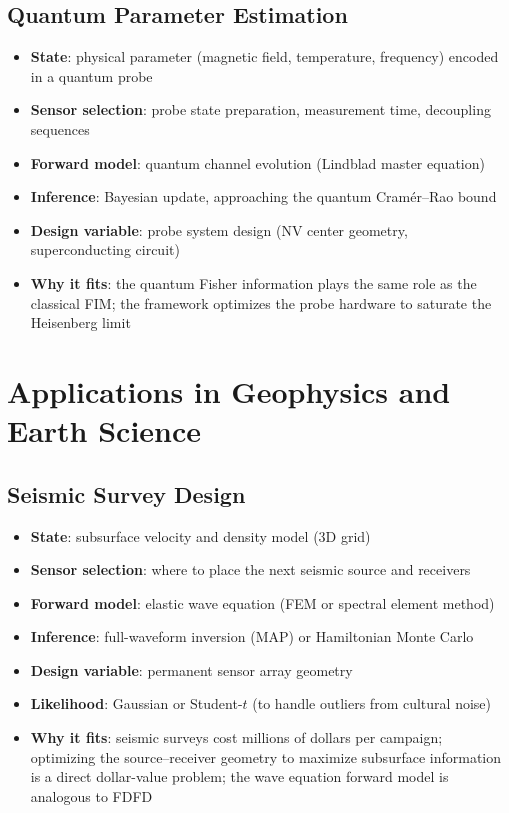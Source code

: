 \documentclass[11pt,a4paper]{article}
\begin{document}
\subsection{Quantum Parameter Estimation}

\begin{itemize}[nosep]
  \item \textbf{State}: physical parameter (magnetic field, temperature, frequency) encoded in a quantum probe
  \item \textbf{Sensor selection}: probe state preparation, measurement time, decoupling sequences
  \item \textbf{Forward model}: quantum channel evolution (Lindblad master equation)
  \item \textbf{Inference}: Bayesian update, approaching the quantum Cram\'{e}r--Rao bound
  \item \textbf{Design variable}: probe system design (NV center geometry, superconducting circuit)
  \item \textbf{Why it fits}: the quantum Fisher information plays the same role as the classical FIM; the framework optimizes the probe hardware to saturate the Heisenberg limit
\end{itemize}

\section{Applications in Geophysics and Earth Science}

\subsection{Seismic Survey Design}

\begin{itemize}[nosep]
  \item \textbf{State}: subsurface velocity and density model (3D grid)
  \item \textbf{Sensor selection}: where to place the next seismic source and receivers
  \item \textbf{Forward model}: elastic wave equation (FEM or spectral element method)
  \item \textbf{Inference}: full-waveform inversion (MAP) or Hamiltonian Monte Carlo
  \item \textbf{Design variable}: permanent sensor array geometry
  \item \textbf{Likelihood}: Gaussian or Student-$t$ (to handle outliers from cultural noise)
  \item \textbf{Why it fits}: seismic surveys cost millions of dollars per campaign; optimizing the source--receiver geometry to maximize subsurface information is a direct dollar-value problem; the wave equation forward model is analogous to FDFD
\end{itemize}
\end{document}
